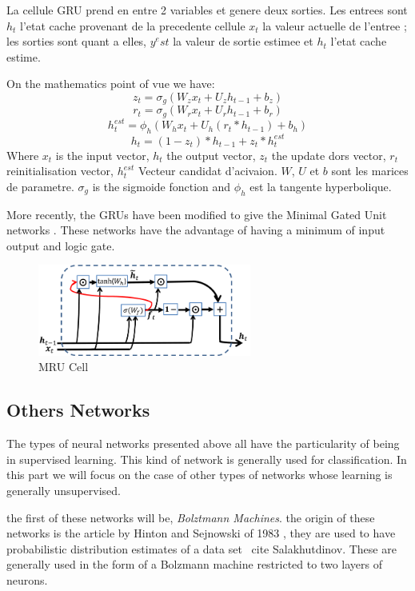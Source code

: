 \documentclass[twoside,twocolumn]{article}
\begin{document}
La cellule GRU prend en entre 2 variables et genere deux sorties. Les entrees sont $h_t$ l'etat cache provenant de la precedente cellule 
$x_t$ la valeur actuelle de l'entree ; les sorties sont quant a elles, $y^est$ la valeur de sortie estimee et $h_t$ l'etat cache estime.

On the mathematics point of vue we have:
\[z_t = \sigma_g(W_{z}x_{t} + U_{z}h_{t-1} + b_{z})\]
\[r_t = \sigma_g(W_{r}x_{t} + U_{r}h_{t-1} + b_{r})\]
\[h_{t}^{est} = \phi_h(W_{h}x_{t} + U_{h}(r_t * h_{t-1}) + b_{h})\]
\[h_t = (1 - z_t)*h_{t-1} + z_t*h_{t}^{est}\]
Where $x_t$ is the input vector, $h_t$ the output vector, $z_t$ the update dors vector, $r_t$ reinitialisation vector, $h_t^{est}$ Vecteur candidat d'acivaion.
$W$, $U$ et $b$ sont les marices de parametre. $\sigma_g$ is the sigmoide  fonction and $\phi_h$ est la tangente hyperbolique.

More recently, the GRUs have been modified to give the Minimal Gated Unit networks \cite{heck2017simplified} \cite{zhou2016minimal}. These networks have the advantage 
of having a minimum of input output and logic gate.

\begin{figure}[h]
  \centering
  \includegraphics[width=70mm]{MRU.png}
  \caption{MRU Cell}
  \label{MRUs}
\end{figure}

\subsection{Others Networks}
The types of neural networks presented above all have the particularity of being in supervised learning. This kind of network is generally used for classification. 
In this part we will focus on the case of other types of networks whose learning is generally unsupervised.

the first of these networks will be, \emph{Bolztmann Machines}. the origin of these networks is the article by Hinton and Sejnowski of 1983 \cite{Rumelhart2}, they 
are used to have probabilistic distribution estimates of a data set \ cite {Salakhutdinov}. These are generally used in the form of a Bolzmann machine restricted 
to two layers of neurons.
\end{document}
